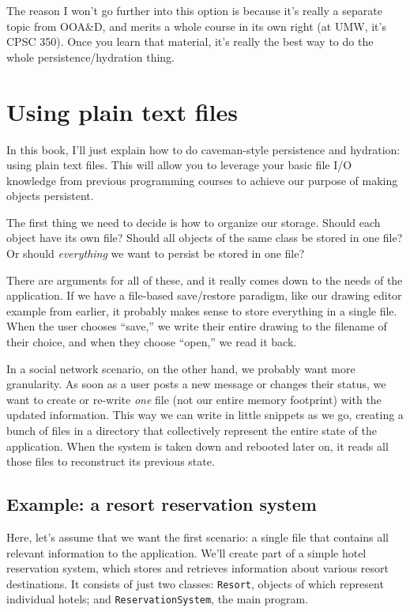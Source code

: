The reason I won't go further into this option is because it's really a
separate topic from OOA\&D, and merits a whole course in its own right (at
UMW, it's CPSC 350). Once you learn that material, it's really the best way to
do the whole persistence/hydration thing.

\section{Using plain text files}

In this book, I'll just explain how to do caveman-style persistence and
hydration: using plain text files. This will allow you to leverage your basic
file I/O knowledge from previous programming courses to achieve our purpose of
making objects persistent.

The first thing we need to decide is how to organize our storage. Should each
object have its own file? Should all objects of the same class be stored in
one file? Or should \textit{everything} we want to persist be stored in one
file?

There are arguments for all of these, and it really comes down to the needs of
the application. If we have a file-based save/restore paradigm, like our
drawing editor example from earlier, it probably makes sense to store
everything in a single file. When the user chooses ``save,'' we write their
entire drawing to the filename of their choice, and when they choose ``open,''
we read it back.

In a social network scenario, on the other hand, we probably want more
granularity. As soon as a user posts a new message or changes their status, we
want to create or re-write \textit{one} file (not our entire memory footprint)
with the updated information. This way we can write in little snippets as we
go, creating a bunch of files in a directory that collectively represent the
entire state of the application. When the system is taken down and rebooted
later on, it reads all those files to reconstruct its previous state.

\subsection{Example: a resort reservation system}

Here, let's assume that we want the first scenario: a single file that
contains all relevant information to the application. We'll create part of a
simple hotel reservation system, which stores and retrieves information about
various resort destinations. It consists of just two classes: \texttt{Resort},
objects of which represent individual hotels; and \texttt{ReservationSystem},
the main program.

